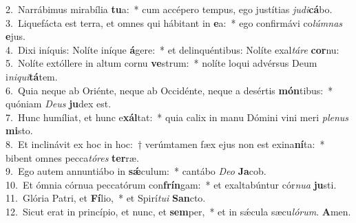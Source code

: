{2.~}Narrábimus mirabília \textbf{tu}a:~* cum accépero tempus, ego justítias \textit{ju}\textit{di}\textbf{cá}bo.\\
{3.~}Liquefácta est terra, et omnes qui hábitant in \textbf{e}a:~* ego confirmávi co\textit{lúm}\textit{nas} \textbf{e}jus.\\
{4.~}Dixi iníquis: Nolíte iníque \textbf{á}gere:~* et delinquéntibus: Nolíte exal\textit{tá}\textit{re} \textbf{cor}nu:\\
{5.~}Nolíte extóllere in altum cornu \textbf{ve}strum:~* nolíte loqui advérsus Deum i\textit{ni}\textit{qui}\textbf{tá}tem.\\
{6.~}Quia neque ab Oriénte, neque ab Occidénte, neque a desértis \textbf{món}tibus:~* quóniam \textit{De}\textit{us} \textbf{ju}dex est.\\
{7.~}Hunc humíliat, et hunc e\textbf{xál}tat:~* quia calix in manu Dómini vini meri \textit{ple}\textit{nus} \textbf{mi}sto.\\
{8.~}Et inclinávit ex hoc in hoc:~† verúmtamen fæx ejus non est exina\textbf{ní}ta:~* bibent omnes pecca\textit{tó}\textit{res} \textbf{ter}ræ.\\
{9.~}Ego autem annuntiábo in \textbf{sǽ}culum:~* cantábo \textit{De}\textit{o} \textbf{Ja}cob.\\
{10.~}Et ómnia córnua peccatórum con\textbf{frín}gam:~* et exaltabúntur cór\textit{nu}\textit{a} \textbf{ju}sti.\\
{11.~}Glória Patri, et \textbf{Fí}lio,~* et Spirí\textit{tu}\textit{i} \textbf{San}cto.\\
{12.~}Sicut erat in princípio, et nunc, et \textbf{sem}per,~* et in sǽcula sæcu\textit{ló}\textit{rum}. \textbf{A}men.\\
